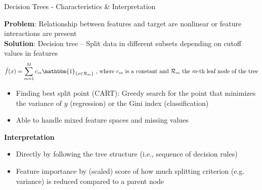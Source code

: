 \documentclass[11pt,compress,t,notes=noshow, aspectratio=169, xcolor=table]{beamer}
\begin{document}

\begin{frame}{Decision Trees - Characteristics \& Interpretation}

\textbf{Problem}: Relationship between features and target are nonlinear or feature interactions are present\\
\medskip
\pause
\textbf{Solution}: Decision tree  -- Split data in different subsets depending on cutoff values in features 
$$
\hat f(x) = \sum_{m=1}^M c_m \mathbbm{1}_{\{x \in \mathcal{R}_m\}}\text{ ,  where $c_m$ is a constant and $\mathcal{R}_m$ the $m$-th leaf node of the tree}
$$

\begin{itemize}
    \item Finding best split point (CART): Greedy search for the point that minimizes the variance of $y$ (regression) or the Gini index (classification)
    \item Able to handle mixed feature spaces and missing values
\end{itemize}
\medskip
\pause
\textbf{Interpretation}
\begin{itemize}
    \item Directly by following the tree structure (i.e., sequence of decision rules)
    \item Feature importance by (scaled) score of how much splitting criterion (e.g. variance) is reduced compared to a parent node
\end{itemize}



\end{frame}
\end{document}
